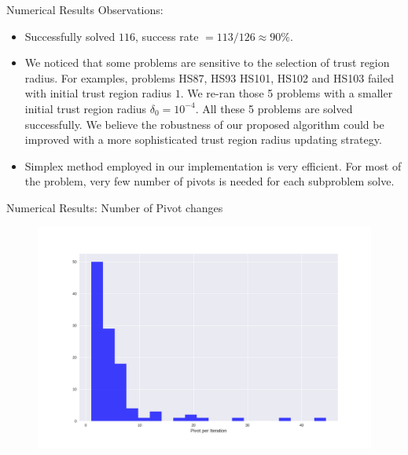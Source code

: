 \documentclass[8pt]{beamer}
\begin{document}
	\begin{frame}{Numerical Results}
		Observations: 
		\vfill
		\begin{itemize}
			\item  Successfully solved $116$, success rate   $  = 113/126 \approx 90 \%$. 
		\vfill
			\item  We noticed that some problems are sensitive to the selection of trust region radius. For examples, problems HS87, HS93 HS101, HS102 and HS103 failed with initial trust region radius $1$. We re-ran those 5 problems with a smaller initial trust region radius $\delta_{0} = 10^{-4}$. All these 5 problems are solved successfully. We believe the robustness of our proposed algorithm could be improved with a more sophisticated trust region radius updating strategy. 
		\vfill
			\item Simplex method employed in our implementation is very efficient. For most of the problem, very few number of pivots is needed for each subproblem solve. 
		\end{itemize}
	\end{frame}

%		

	\begin{frame}[c]{Numerical Results:  Number of Pivot changes }
		\begin{figure}[H]
			\includegraphics[width=\textwidth]{pic/pivot-per-iteration}
		\end{figure}
	\end{frame}

%		 
		
\end{document}
